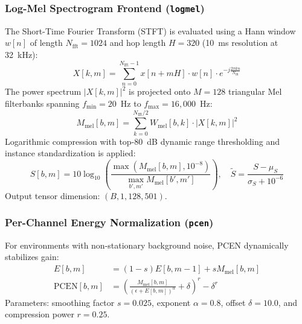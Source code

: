 \documentclass[11pt,a4paper]{article}
\begin{document}
\subsubsection{Log-Mel Spectrogram Frontend (\texttt{logmel})}
The Short-Time Fourier Transform (STFT) is evaluated using a Hann window $w[n]$ of length $N_{\text{fft}} = 1024$ and hop length $H = 320$ (10~ms resolution at 32~kHz):
\begin{equation}
    X[k, m] = \sum_{n=0}^{N_{\text{fft}}-1} x[n + m H] \cdot w[n] \cdot e^{-j \frac{2\pi k n}{N_{\text{fft}}}}
\end{equation}
The power spectrum $|X[k, m]|^2$ is projected onto $M = 128$ triangular Mel filterbanks spanning $f_{\min} = 20$~Hz to $f_{\max} = 16{,}000$~Hz:
\begin{equation}
    M_{\text{mel}}[b, m] = \sum_{k=0}^{N_{\text{fft}}/2} W_{\text{mel}}[b, k] \cdot |X[k, m]|^2
\end{equation}
Logarithmic compression with top-80~dB dynamic range thresholding and instance standardization is applied:
\begin{equation}
    S[b, m] = 10 \log_{10} \left( \frac{\max(M_{\text{mel}}[b, m], 10^{-8})}{\max_{b', m'} M_{\text{mel}}[b', m']} \right), \quad \tilde{S} = \frac{S - \mu_S}{\sigma_S + 10^{-6}}
\end{equation}
Output tensor dimension: $(B, 1, 128, 501)$.

\subsubsection{Per-Channel Energy Normalization (\texttt{pcen})}
For environments with non-stationary background noise, PCEN dynamically stabilizes gain:
\begin{align}
    E[b, m] &= (1 - s) E[b, m-1] + s M_{\text{mel}}[b, m] \\
    \text{PCEN}[b, m] &= \left( \frac{M_{\text{mel}}[b, m]}{(\epsilon + E[b, m])^\alpha} + \delta \right)^r - \delta^r
\end{align}
Parameters: smoothing factor $s = 0.025$, exponent $\alpha = 0.8$, offset $\delta = 10.0$, and compression power $r = 0.25$.
\end{document}
